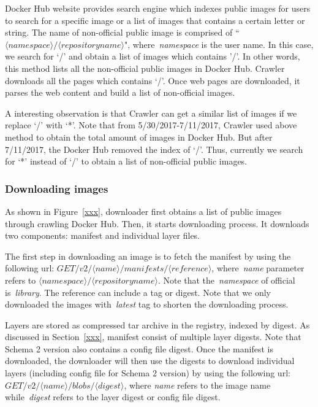 Docker Hub website provides search engine which indexes public images for users to search for a specific image or a list of images that contains a certain letter or string. The name of non-official public image is comprised of ``$\langle namespace\rangle/\langle repository name \rangle$", where~\textit{namespace} is the user name. In this case, we search for `/' and obtain a list of images which contains '/'. In other words, this method lists all the non-official public images in Docker Hub. Crawler downloads all the pages which contains `/'. Once web pages are downloaded, it parses the web content and build a list of non-official images. 

A interesting observation is that Crawler can get a similar list of images if we replace `/' with `*'. Note that from 5/30/2017-7/11/2017, Crawler used above method to obtain the total amount of images in Docker Hub. But after 7/11/2017, the Docker Hub removed the index of `/'. Thus, currently we search for `*' instead of `/' to obtain a list of non-official public images.

\subsubsection{Downloading images}

As shown in Figure~\ref{xxx}, downloader first obtains a list of public images through crawling Docker Hub. Then, it starts downloading process. It downloads two components: manifest and individual layer files. 

The first step in downloading an image is to fetch the manifest by using the following url: $GET /v2/\langle name \rangle/manifests/\langle reference \rangle$, where~\textit{name} parameter refers to $\langle namespace\rangle/\langle repository name \rangle$. Note that the~\textit{namespace} of official is~\textit{library}. The reference can include a tag or digest. Note that we only downloaded the images with~\textit{latest} tag to shorten the downloading process. 

Layers are stored as compressed tar archive in the registry, indexed by digest. As discussed in Section~\ref{xxx}, manifest consist of multiple layer digests. Note that Schema 2 version also contains a config file digest. Once the manifest is downloaded, the downloader will then use the digests to download individual layers (including config file for Schema 2 version) by using the following url: $GET /v2/\langle name \rangle/blobs/\langle digest \rangle$, where \textit{name} refers to the image name while~\textit{digest} refers to the layer digest or config file digest.

